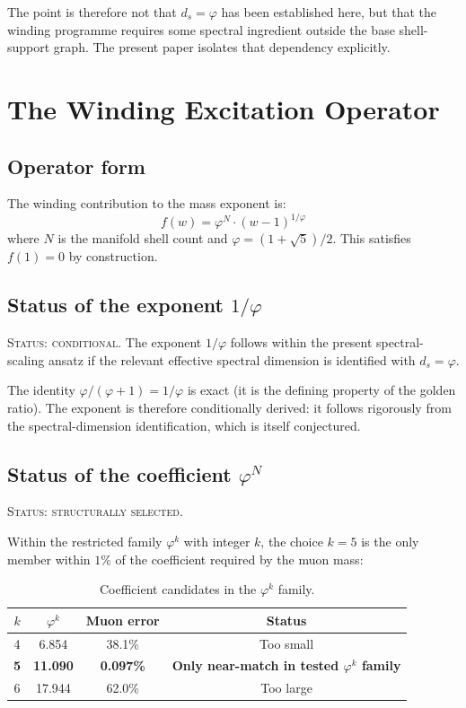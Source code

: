 \documentclass[12pt]{article}
\newcommand{\phig}{\varphi}
\newcommand{\ds}{d_s}
\begin{document}
The point is therefore not that $\ds = \phig$ has been established here, but that the winding programme requires some spectral ingredient outside the base shell-support graph. The present paper isolates that dependency explicitly.

\section{The Winding Excitation Operator}\label{sec:operator}

\subsection{Operator form}

The winding contribution to the mass exponent is:
\begin{equation}\label{eq:fw}
    f(w) = \phig^N \cdot (w - 1)^{1/\phig}
\end{equation}
where $N$ is the manifold shell count and $\phig = (1+\sqrt{5})/2$. This satisfies $f(1) = 0$ by construction.

\subsection{Status of the exponent $1/\phig$}

\textsc{Status: conditional.} The exponent $1/\phig$ follows within the present spectral-scaling ansatz if the relevant effective spectral dimension is identified with $\ds = \phig$.

The identity $\phig/(\phig+1) = 1/\phig$ is exact (it is the defining property of the golden ratio). The exponent is therefore conditionally derived: it follows rigorously from the spectral-dimension identification, which is itself conjectured.

\subsection{Status of the coefficient $\phig^N$}

\textsc{Status: structurally selected.}

Within the restricted family $\phig^k$ with integer $k$, the choice $k = 5$ is the only member within $1\%$ of the coefficient required by the muon mass:

\begin{table}[ht]
\centering
\caption{Coefficient candidates in the $\phig^k$ family.}
\label{tab:coefficient}
\begin{tabular}{@{}cccc@{}}
\toprule
$k$ & $\phig^k$ & Muon error & Status \\
\midrule
4 & 6.854 & 38.1\% & Too small \\
\textbf{5} & \textbf{11.090} & \textbf{0.097\%} & \textbf{Only near-match in tested $\phig^k$ family} \\
6 & 17.944 & 62.0\% & Too large \\
\bottomrule
\end{tabular}
\end{table}
\end{document}
